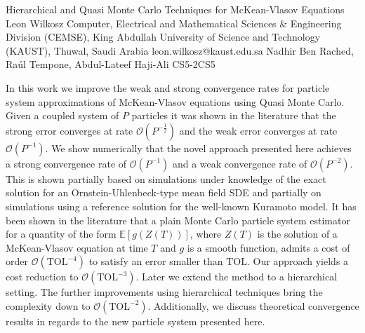 \begin{talk}
  {Hierarchical and Quasi Monte Carlo
Techniques for McKean-Vlasov Equations}%
  {Leon Wilkosz}%
  {Computer, Electrical and Mathematical Sciences \& Engineering Division (CEMSE), King Abdullah
University of Science and Technology (KAUST), Thuwal, Saudi Arabia}%
  {leon.wilkosz@kaust.edu.sa}%
  {Nadhir Ben Rached, Raúl Tempone, Abdul-Lateef Haji-Ali}%
{}{}{CS5-2}{CS5}


				
				

In this work we improve the weak and strong convergence rates for particle system approximations of McKean-Vlasov equations using Quasi Monte Carlo. Given a coupled system of $P$ particles it was shown in the literature that the strong error converges at rate $\mathcal{O}(P^{-\frac{1}{2}})$ and the weak error converges at rate $\mathcal{O}(P^{-1})$. We show numerically that the novel approach presented here achieves a strong convergence rate of $\mathcal{O}(P^{-1})$ and a weak convergence rate of $\mathcal{O}(P^{-2})$. This is shown partially based on simulations under knowledge of the exact solution for an Ornstein-Uhlenbeck-type mean field SDE and partially on simulations using a reference solution for the well-known Kuramoto model. It has been shown in the literature that a plain Monte Carlo particle system estimator for a quantity of the form $\mathbb{E}[g(Z(T))]$, where $Z(T)$ is the solution of a McKean-Vlasov equation at time $T$ and $g$ is a smooth function, admits a cost of order $\mathcal{O}(\text{TOL}^{-4})$ to satisfy an error smaller than $\text{TOL}$. Our approach yields a cost reduction to $\mathcal{O}(\text{TOL}^{-3})$. Later we extend the method to a hierarchical setting. The further improvements using hierarchical techniques bring the complexity down to $\mathcal{O}(\text{TOL}^{-2})$. Additionally, we discuss theoretical convergence results in regards to the new particle system presented here.
\end{talk}

